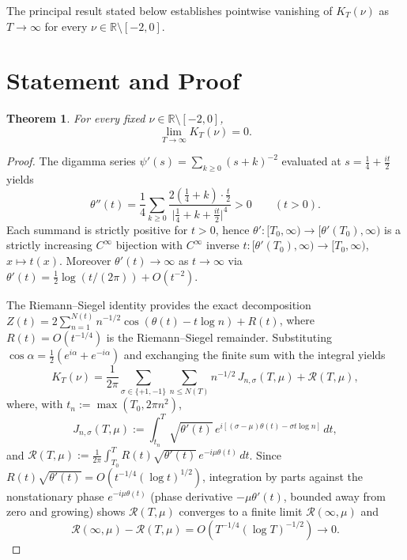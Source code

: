 \documentclass[12pt]{article}
\newtheorem{theorem}{Theorem}
\begin{document}
The principal result stated below establishes pointwise vanishing of $K_T(\nu)$ as $T\to\infty$ for every $\nu\in\mathbb{R}\setminus[-2,0]$.

\section{Statement and Proof}

\begin{theorem}
For every fixed $\nu\in\mathbb{R}\setminus[-2,0]$,
\begin{equation}
\lim_{T\to\infty} K_T(\nu) = 0.
\end{equation}
\end{theorem}

\begin{proof}
The digamma series $\psi'(s)=\sum_{k\ge 0}(s+k)^{-2}$ evaluated at $s=\tfrac{1}{4}+\tfrac{it}{2}$ yields
\begin{equation}
\theta''(t) = \frac{1}{4}\sum_{k\ge 0}\frac{2(\tfrac{1}{4}+k)\cdot\tfrac{t}{2}}{\bigl|\tfrac{1}{4}+k+\tfrac{it}{2}\bigr|^{4}} > 0 \qquad (t>0).
\end{equation}
Each summand is strictly positive for $t>0$, hence $\theta':[T_0,\infty)\to[\theta'(T_0),\infty)$ is a strictly increasing $C^{\infty}$ bijection with $C^{\infty}$ inverse $t:[\theta'(T_0),\infty)\to[T_0,\infty)$, $x\mapsto t(x)$. Moreover $\theta'(t)\to\infty$ as $t\to\infty$ via $\theta'(t)=\tfrac{1}{2}\log(t/(2\pi))+O(t^{-2})$.

The Riemann--Siegel identity provides the exact decomposition $Z(t)=2\sum_{n=1}^{N(t)}n^{-1/2}\cos(\theta(t)-t\log n)+R(t)$, where $R(t)=O(t^{-1/4})$ is the Riemann--Siegel remainder. Substituting $\cos\alpha=\tfrac{1}{2}(e^{i\alpha}+e^{-i\alpha})$ and exchanging the finite sum with the integral yields
\begin{equation}
K_T(\nu) = \frac{1}{2\pi}\sum_{\sigma\in\{+1,-1\}}\sum_{n\le N(T)} n^{-1/2}\, J_{n,\sigma}(T,\mu) + \mathcal{R}(T,\mu),
\end{equation}
where, with $t_n:=\max(T_0,2\pi n^{2})$,
\begin{equation}
J_{n,\sigma}(T,\mu) := \int_{t_n}^{T}\sqrt{\theta'(t)}\,e^{i[(\sigma-\mu)\theta(t)-\sigma t\log n]}\,dt,
\end{equation}
and $\mathcal{R}(T,\mu):=\frac{1}{2\pi}\int_{T_0}^{T}R(t)\sqrt{\theta'(t)}\,e^{-i\mu\theta(t)}\,dt$. Since $R(t)\sqrt{\theta'(t)}=O(t^{-1/4}(\log t)^{1/2})$, integration by parts against the nonstationary phase $e^{-i\mu\theta(t)}$ (phase derivative $-\mu\theta'(t)$, bounded away from zero and growing) shows $\mathcal{R}(T,\mu)$ converges to a finite limit $\mathcal{R}(\infty,\mu)$ and
\begin{equation}
\mathcal{R}(\infty,\mu)-\mathcal{R}(T,\mu) = O\!\left(T^{-1/4}(\log T)^{-1/2}\right)\to 0.
\end{equation}


\end{proof}
\end{document}
